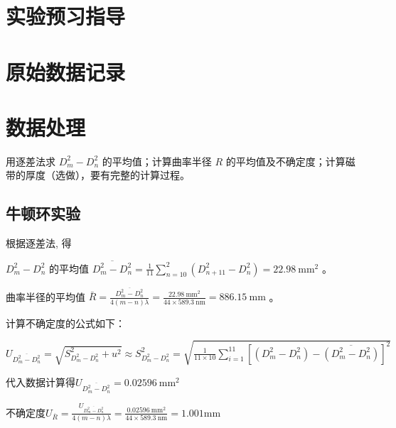 \documentclass[signature=data]{physicsreport}
\begin{document}
\maketitle

\section{实验预习指导}
\newpage

\section{原始数据记录}
\makeatletter
{}
\makeatother

\newpage

\section{数据处理}

用逐差法求 $D^2_m - D^2_n$ 的平均值；计算曲率半径 $R$ 的平均值及不确定度；计算磁带的厚度（选做），要有完整的计算过程。

\subsection{牛顿环实验}

根据逐差法, 得 

$D^2_m - D^2_n$ 的平均值 $ \overline{D_{m}^{2}-D_{n}^{2}}=\frac{1}{11} \sum_{n=10}^{2}\left(D_{n+11}^{2}-D_{n}^{2}\right)=22.98 \mathrm{~mm}^{2} $ 。

曲率半径的平均值  $\bar{R}=\frac{\overline{D_{m}^{2}-D_{n}^{2}}}{4(m-n) \lambda}=\frac{22.98 \mathrm{~mm}^{2}}{44 \times 589.3 \mathrm{~nm}}=886.15 \mathrm{~mm} $ 。

计算不确定度的公式如下：

$U_{\overline{D^2_m-D^2_n}} = \sqrt {S^2_{D^2_m - D^2_n} + u^2} \approx S^2_{D^2_m - D^2_n} = \sqrt{\frac{1}{11 \times 10} \sum_{i=1}^{11} [(D^2_m - D^2_{n}) - \overline{(D^2_{m} - D^2_{n})} ]^2}$

代入数据计算得$U_{\overline{D^2_m-D^2_n}}=0.02596\mathrm{~mm}^{2}$

不确定度$U_{\overline{R}}=\frac{U_{\overline{D^2_m-D^2_n}}}{4(m-n)\lambda}=\frac{0.02596 \mathrm{~mm}^{2}}{44 \times 589.3 \mathrm{~nm}}=1.001\mathrm{mm}$
\end{document}
